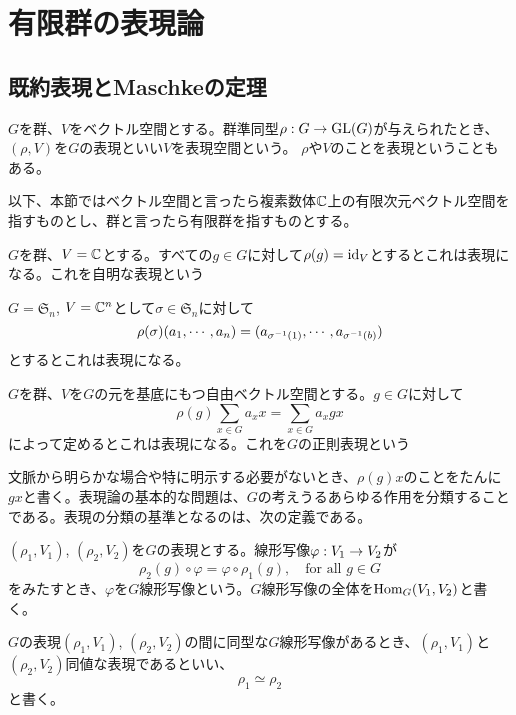 \documentclass{ltjsarticle}
\begin{document}
\section{有限群の表現論}
\subsection{既約表現とMaschkeの定理}

\begin{defin}
  $G$を群、$V$をベクトル空間とする。群準同型$\rho:G\rightarrow\mathrm{GL}(G)$が与えられたとき、$(\rho,V)$を$G$の表現といい$V$を表現空間という。
  $\rho$や$V$のことを表現ということもある。
\end{defin} 

以下、本節ではベクトル空間と言ったら複素数体$\mathbb{C}$上の有限次元ベクトル空間を指すものとし、群と言ったら有限群を指すものとする。

\begin{eg}
  $G$を群、$V=\mathbb{C}$とする。すべての$g\in G$に対して$\rho(g)=\text{id}_{V}$とするとこれは表現になる。これを自明な表現という
\end{eg}

\begin{eg}\label{natural}
  $G=\mathfrak{S}_n$, $V=\mathbb{C}^n$として$\sigma\in\mathfrak{S}_n$に対して
  \[
  \rho(\sigma)(a_1,\cdots,a_n)=(a_{\sigma^{-1}(1)},\cdots,a_{\sigma^{-1}(b)})  
  \]
  とするとこれは表現になる。
\end{eg}

\begin{eg}\label{regular}
  $G$を群、$V$を$G$の元を基底にもつ自由ベクトル空間とする。$g\in G$に対して
  \[
  \rho(g)\sum_{x\in G}a_xx=\sum_{x\in G}a_xgx  
  \]
  によって定めるとこれは表現になる。これを$G$の正則表現という
\end{eg}

文脈から明らかな場合や特に明示する必要がないとき、$\rho(g)x$のことをたんに$gx$と書く。表現論の基本的な問題は、$G$の考えうるあらゆる作用を分類することである。表現の分類の基準となるのは、次の定義である。

\begin{defin}
  $(\rho_1,V_1)$, $(\rho_2,V_2)$を$G$の表現とする。線形写像$\varphi:V_1\rightarrow V_2$が
  \[
  \rho_2(g)\circ\varphi=\varphi\circ\rho_1(g),\quad \text{for all $g\in G$}
  \]
  をみたすとき、$\varphi$を$G$線形写像という。$G$線形写像の全体を$\text{Hom}_G(V_1,V_2)$と書く。
\end{defin}

\begin{defin}
  $G$の表現$(\rho_1,V_1)$, $(\rho_2,V_2)$の間に同型な$G$線形写像があるとき、$(\rho_1,V_1)$と$(\rho_2,V_2)$同値な表現であるといい、
  \[
  \rho_1\simeq\rho_2  
  \]
  と書く。
\end{defin}
\end{document}
